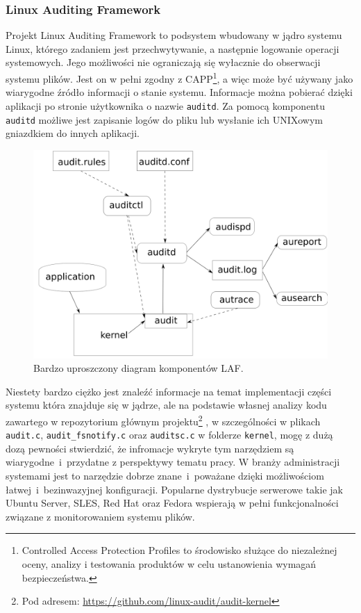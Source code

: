 \subsubsection{Linux Auditing Framework}
\label{sec:auditd}
Projekt Linux Auditing Framework to podsystem wbudowany w jądro systemu Linux, którego zadaniem jest przechwytywanie,
a następnie logowanie operacji systemowych. Jego możliwości nie ograniczają się wyłacznie do 
obserwacji systemu plików. Jest on w pełni zgodny z CAPP\footnote{Controlled Access Protection Profiles to środowisko służące do niezależnej oceny, analizy i testowania produktów w celu ustanowienia wymagań bezpieczeństwa.}, a
więc może być używany jako wiarygodne źródło informacji o stanie systemu. Informacje można pobierać dzięki aplikacji
po stronie użytkownika o nazwie \texttt{auditd}. Za pomocą komponentu \texttt{auditd} możliwe jest zapisanie logów do pliku lub wysłanie ich UNIXowym gniazdkiem do innych aplikacji.
\begin{figure}[H]
    \centering
    \includegraphics[width=0.6\linewidth]{rysunki/audit.png}
    \caption{Bardzo uproszczony diagram komponentów LAF\protect\footnotemark.}
    \label{fig:enter-label}
\end{figure}

Niestety bardzo ciężko jest znaleźć informacje na temat implementacji części systemu która znajduje się w jądrze, ale 
na podstawie własnej analizy kodu zawartego w repozytorium głównym projektu\footnote{Pod adresem: \url{https://github.com/linux-audit/audit-kernel}}
, w szczególności w plikach \texttt{audit.c}, \texttt{audit\_fsnotify.c} oraz \texttt{auditsc.c} w folderze \texttt{kernel}, mogę z dużą
dozą pewności stwierdzić, że infromacje wykryte tym narzędziem są wiarygodne~i~przydatne z perspektywy tematu pracy.
W branży administracji systemami jest to narzędzie dobrze znane~i~poważane dzięki możliwościom łatwej~i~bezinwazyjnej konfiguracji.
Popularne dystrybucje serwerowe takie jak Ubuntu Server, SLES, Red Hat oraz Fedora wspierają w pełni funkcjonalności
związane z monitorowaniem systemu plików. 

